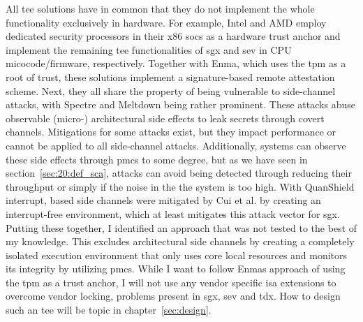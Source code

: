 All \gls{tee} solutions have in common that they do not implement the whole
functionality exclusively in hardware. For example, Intel and AMD employ
dedicated security processors in their x86 \glspl{soc} as a hardware trust
anchor and implement the remaining \gls{tee} functionalities of \gls{sgx} and
\gls{sev} in CPU micocode/firmware, respectively. Together with Enma, which uses
the \gls{tpm} as a root of trust, these solutions implement a signature-based
remote attestation scheme. Next, they all share the property of being vulnerable
to side-channel attacks, with Spectre and Meltdown being rather prominent. These
attacks abuse observable (micro-) architectural side effects to leak secrets
through covert channels. Mitigations for some attacks exist, but they impact
performance or cannot be applied to all side-channel attacks. Additionally,
systems can observe these side effects through \glspl{pmc} to some degree, but
as we have seen in section~\ref{sec:20:def_sca}, attacks can avoid being
detected through reducing their throughput or simply if the noise in the the
system is too high. With QuanShield interrupt, based side channels were
mitigated by Cui et al. by creating an interrupt-free environment, which at
least mitigates this attack vector for \gls{sgx}.\\

Putting these together, I identified an approach that was not tested to the best
of my knowledge. This excludes architectural side channels by creating a
completely isolated execution environment that only uses core local resources
and monitors its integrity by utilizing \glspl{pmc}. While I want to follow
Enmas approach of using the \gls{tpm} as a trust anchor, I will not use any
vendor specific \gls{isa} extensions to overcome vendor locking, problems
present in \gls{sgx}, \gls{sev} and \gls{tdx}. How to design such an \gls{tee}
will be topic in chapter~\ref{sec:design}.


\cleardoublepage


